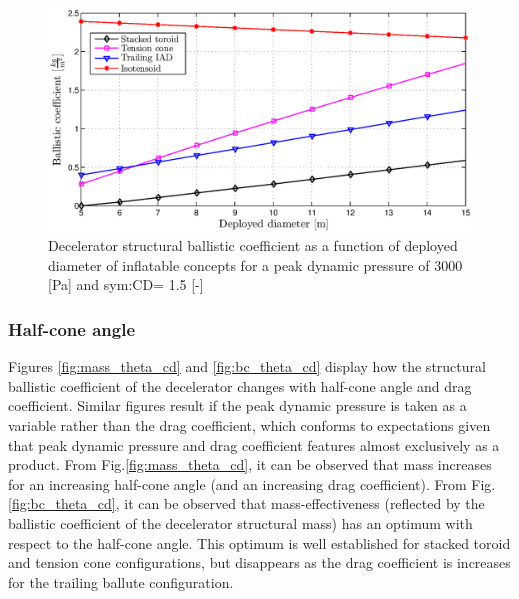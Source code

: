 \begin{figure}[H]
\centering
\includegraphics[width = 1.0\textwidth]{Figure/bc_dia.eps}
\caption{Decelerator structural ballistic coefficient as a function of deployed diameter of inflatable concepts for a peak dynamic pressure of 3000 [Pa] and \gls{sym:CD}= 1.5 [-]}
\label{fig:bc_dia}
\end{figure}

\subsubsection{Half-cone angle}
Figures \ref{fig:mass_theta_cd} and \ref{fig:bc_theta_cd} display how the structural ballistic coefficient of the decelerator changes with half-cone angle and drag coefficient. Similar figures result if the peak dynamic pressure is taken as a variable rather than the drag coefficient, which conforms to expectations given that peak dynamic pressure and drag coefficient features almost exclusively as a product. From Fig.\ref{fig:mass_theta_cd}, it can be observed that mass increases for an increasing half-cone angle (and an increasing drag coefficient). From  Fig.\ref{fig:bc_theta_cd}, it can be observed that mass-effectiveness (reflected by the ballistic coefficient of the decelerator structural mass) has an optimum with respect to the half-cone angle. This optimum is well established for stacked toroid and tension cone configurations, but disappears as the drag coefficient is increases for the trailing ballute configuration.

